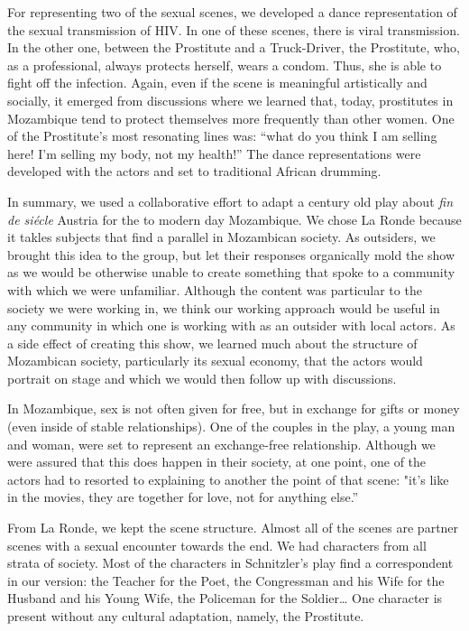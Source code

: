 \documentclass[article,twocolumn]{memoir}
\begin{document}
For representing two of the sexual scenes, we developed a dance representation
of the sexual transmission of HIV. In one of these scenes, there is viral
transmission. In the other one, between the Prostitute and a Truck-Driver, the
Prostitute, who, as a professional, always protects herself, wears a condom.
Thus, she is able to fight off the infection. Again, even if the scene is
meaningful artistically and socially, it emerged from discussions where we
learned that, today, prostitutes in Mozambique tend to protect themselves
more frequently than other women. One of the Prostitute's most resonating lines
was: ``what do you think I am selling here! I'm selling my body, not my
health!'' The dance representations were developed with the actors and set to
traditional African drumming.

\bigskip
\bigskip
\bigskip

In summary, we used a collaborative effort to adapt a century old play about
\textit{fin de si\'{e}cle} Austria for the to modern day Mozambique. We chose
La Ronde because it takles subjects that find a parallel in Mozambican society.
As outsiders, we brought this idea to the group, but let their responses
organically mold the show as we would be otherwise unable to create something
that spoke to a community with which we were unfamiliar. Although the content
was particular to the society we were working in, we think our working approach
would be useful in any community in which one is working with as an outsider
with local actors. As a side effect of creating this show, we learned much
about the structure of Mozambican society, particularly its sexual economy,
that the actors would portrait on stage and which we would then follow up with
discussions.

In Mozambique, sex is not often given for free, but in exchange for gifts or
money (even inside of stable relationships). One of the couples in the play, a
young man and woman, were set to represent an exchange-free relationship.
Although we were assured that this does happen in their society, at one point,
one of the actors had to resorted to explaining to another the point of that
scene: "it's like in the movies, they are together for love, not for anything
else.''

From La Ronde, we kept the scene structure. Almost all of the scenes are
partner scenes with a sexual encounter towards the end. We had characters from
all strata of society. Most of the characters in Schnitzler's play find a
correspondent in our version: the Teacher for the Poet, the Congressman and his
Wife for the Husband and his Young Wife, the Policeman for the Soldier\ldots
One character is present without any cultural adaptation, namely, the
Prostitute.
\end{document}
